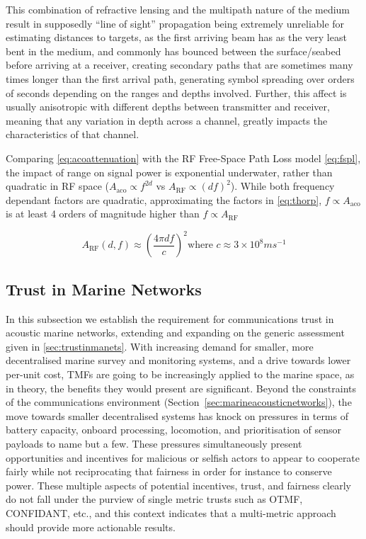 \documentclass[runningheads,a4paper]{llncs}
\begin{document}
This combination of refractive lensing and the multipath nature of the medium result in supposedly ``line of sight'' propagation being extremely unreliable for estimating distances to targets, as the first arriving beam has as the very least bent in the medium, and commonly has bounced between the surface/seabed before arriving at a receiver, creating secondary paths that are sometimes many times longer than the first arrival path, generating symbol spreading over orders of seconds depending on the ranges and depths involved.
Further, this affect is usually anisotropic with different depths between transmitter and receiver, meaning that any variation in depth across a channel, greatly impacts the characteristics of that channel.

Comparing \eqref{eq:acoattenuation} with the RF Free-Space Path Loss model \eqref{eq:fspl}, the impact of range on signal power is exponential underwater, rather than quadratic in RF space ($A_{\text{aco}} \propto f^{2d}$ vs $A_{\text{RF}} \propto (df)^2$).
While both frequency dependant factors are quadratic, approximating the factors in \eqref{eq:thorp}, $f\propto A_{\text{aco}}$ is at least 4 orders of magnitude higher than $f\propto A_{\text{RF}}$

\begin{equation}
  \label{eq:fspl}
  A_{\text{RF}}(d,f) \approx \left( \frac{4\pi d f}{c} \right)^2
  \text{where }c\approx 3\times10^8ms^{-1}
\end{equation}



\subsection{Trust in Marine Networks}

In this subsection we establish the requirement for communications trust in acoustic marine networks, extending and expanding on the generic assessment given in \ref{sec:trustinmanets}. 
With increasing demand for smaller, more decentralised marine survey and monitoring systems, and a drive towards lower per-unit cost, TMFs are going to be increasingly applied to the marine space, as in theory, the benefits they would present are significant. 
Beyond the constraints of the communications environment (Section~\ref{sec:marineacousticnetworks}), the move towards smaller decentralised systems has knock on pressures in terms of battery capacity, onboard processing, locomotion, and prioritisation of sensor payloads to name but a few.
These pressures simultaneously present opportunities and incentives for malicious or selfish actors to appear to cooperate fairly while not reciprocating that fairness in order for instance to conserve power.
These multiple aspects of potential incentives, trust, and fairness clearly do not fall under the purview of single metric trusts such as OTMF, CONFIDANT, etc., and this context indicates that a multi-metric approach should provide more actionable results.
\end{document}
